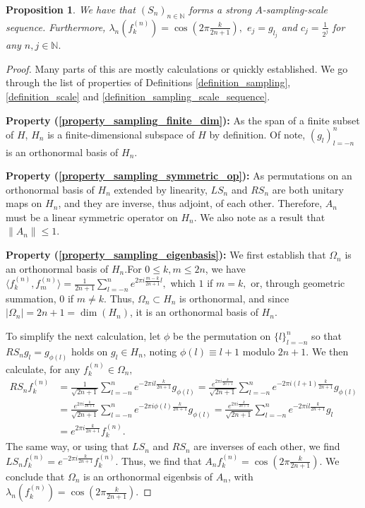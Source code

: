 \documentclass{amsart}
\newtheorem{prop}[thm]{Proposition}
\theoremstyle{definition}
\theoremstyle{remark}
\def \LL{\langle}
\def \RR{\rangle}
\begin{document}
\begin{prop}\label{proposition_shift_sampling_sequence}
	We have that $(S_n)_{n\in\mathbb{N}}$ forms a strong $A$-sampling-scale sequence. Furthermore, $\lambda_n(f_k^{(n)})=\cos\left(2\pi\frac{k}{2n+1} \right),$ $e_j=g_{l_j}$ and $c_j=\frac{1}{2^j}$ for any $n, j\in\mathbb{N}.$
\end{prop}
\begin{proof}
	Many parts of this are mostly calculations or quickly established. We go through the list of properties of Definitions \ref{definition_sampling}, \ref{definition_scale} and \ref{definition_sampling_scale_sequence}.
	
	\textbf{Property (\ref{property_sampling_finite_dim}):} As the span of a finite subset of $H$, $H_n$ is a finite-dimensional subspace of $H$ by definition. Of note, $(g_l)_{l=-n}^n$ is an orthonormal basis of $H_n$.
	
	\textbf{Property (\ref{property_sampling_symmetric_op}):} As permutations on an orthonormal basis of $H_n$ extended by linearity, $LS_n$ and $RS_n$ are both unitary maps on $H_n$, and they are inverse, thus adjoint, of each other. Therefore, $A_n$ must be a linear symmetric operator on $H_n.$ We also note as a result that $\|A_n\|\leq 1.$
	
	\textbf{Property (\ref{property_sampling_eigenbasis}):} We first establish that $\Omega_n$ is an orthonormal basis of $H_n$.For $0\leq k,m\leq 2n$, we have  $\LL f_k^{(n)}, f_m^{(n)} \RR=\frac{1}{2n+1}\sum_{l=-n}^n e^{2\pi i \frac{m-k}{2n+1}l},$ which $1$ if $m=k,$ or, through geometric summation, $0$ if $m\neq k.$ Thus, $\Omega_n\subset H_n$ is orthonormal, and since $|\Omega_n|=2n+1=\dim(H_n)$, it is an orthonormal basis of $H_n$. 
	
	To simplify the next calculation, let $\phi$ be the permutation on $\{l\}_{l=-n}^n$ so that $RS_n g_l=g_{\phi(l)}$ holds on $g_l\in H_n$, noting $\phi(l)\equiv l+1$ modulo $2n+1$. We then calculate, for any $f_k^{(n)}\in\Omega_n,$
	\begin{align*}
		RS_n f_k^{(n)}&=\frac{1}{\sqrt{2n+1}}\sum_{l=-n}^n e^{-2\pi i l \frac{k}{2n+1}}g_{\phi(l)}=\frac{e^{2\pi i\frac{k}{2n+1}}}{\sqrt{2n+1}}\sum_{l=-n}^n e^{-2\pi i (l+1) \frac{k}{2n+1}}g_{\phi(l)}\\
		&=\frac{e^{2\pi i\frac{k}{2n+1}}}{\sqrt{2n+1}}\sum_{l=-n}^n e^{-2\pi i \phi(l) \frac{k}{2n+1}}g_{\phi(l)}=\frac{e^{2\pi i\frac{k}{2n+1}}}{\sqrt{2n+1}}\sum_{l=-n}^n e^{-2\pi i l \frac{k}{2n+1}}g_{l}\\
		&=e^{2\pi i\frac{k}{2n+1}}f_k^{(n)}.
	\end{align*}
	The same way, or using that $LS_n$ and $RS_n$ are inverses of each other, we find $LS_n f_k^{(n)}=e^{-2\pi i\frac{k}{2n+1}}f_k^{(n)}.$ Thus, we find that $A_n f_k^{(n)}= \cos\left(2\pi\frac{k}{2n+1}\right).$ We conclude that $\Omega_n$ is an orthonormal eigenbsis of $A_n$, with $\lambda_n(f_k^{(n)})=\cos\left(2\pi\frac{k}{2n+1}\right).$
	

\end{proof}
\end{document}
